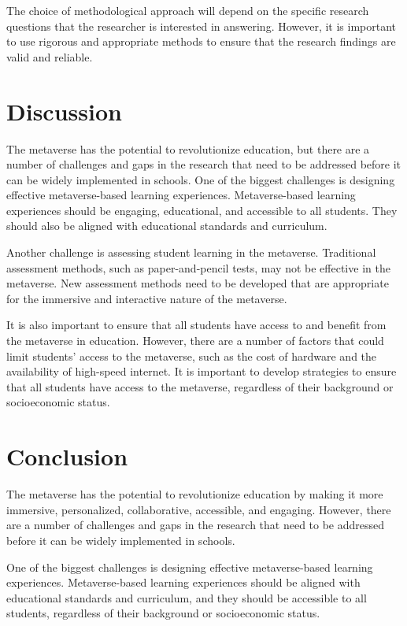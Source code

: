 \documentclass[12pt]{extarticle}
\begin{document}
The choice of methodological approach will depend on the specific research questions that the researcher is interested in answering. However, it is important to use rigorous and appropriate methods to ensure that the research findings are valid and reliable.


\section{Discussion}
The metaverse has the potential to revolutionize education, but there are a number of challenges and gaps in the research that need to be addressed before it can be widely implemented in schools. One of the biggest challenges is designing effective metaverse-based learning experiences. Metaverse-based learning experiences should be engaging, educational, and accessible to all students. They should also be aligned with educational standards and curriculum.

Another challenge is assessing student learning in the metaverse. Traditional assessment methods, such as paper-and-pencil tests, may not be effective in the metaverse. New assessment methods need to be developed that are appropriate for the immersive and interactive nature of the metaverse.

It is also important to ensure that all students have access to and benefit from the metaverse in education. However, there are a number of factors that could limit students' access to the metaverse, such as the cost of hardware and the availability of high-speed internet. It is important to develop strategies to ensure that all students have access to the metaverse, regardless of their background or socioeconomic status.

\section{Conclusion}

The metaverse has the potential to revolutionize education by making it more immersive, personalized, collaborative, accessible, and engaging. However, there are a number of challenges and gaps in the research that need to be addressed before it can be widely implemented in schools.

One of the biggest challenges is designing effective metaverse-based learning experiences. Metaverse-based learning experiences should be aligned with educational standards and curriculum, and they should be accessible to all students, regardless of their background or socioeconomic status.
\end{document}
